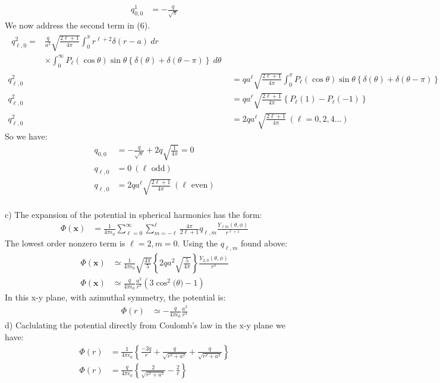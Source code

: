 \documentclass[a4paper,11pt]{article}
\numberwithin{equation}{section}
\newcommand{\bv}[1]{\mathbf{#1}}
\newcommand{\ez}{\epsilon_0}
\newcommand{\lrp}[1]{\left({#1}\right)}
\newcommand{\lrb}[1]{\left\{{#1}\right\}}
\begin{document}
\begin{align}
 q^1_{0,0} &= -\frac{q}{\sqrt{\pi}}
\end{align}
We now address the second term in (6).
\begin{align}
\begin{split}
 q^2_{\ell,0} = &\frac{q}{a^2} \sqrt{\frac{2\ell+1}{4\pi}}\int_0^\pi r^{\ell+2} \delta(r-a) \ dr \\
		&\times \int_0^\infty P_\ell(\cos{\theta})\sin{\theta} \lrb{\delta(\theta)+\delta(\theta-\pi)}\ d\theta
\end{split}\\
 q^2_{\ell,0} &= qa^\ell\sqrt{\frac{2\ell+1}{4\pi}} \int_0^\pi  P_\ell(\cos{\theta})\sin{\theta} \lrb{\delta(\theta)+\delta(\theta-\pi)}\ d\theta\\
 q^2_{\ell,0} &= qa^\ell\sqrt{\frac{2\ell+1}{4\pi}} \lrb{P_\ell(1)-P_\ell(-1)}\\
 q^2_{\ell,0} &= 2qa^\ell\sqrt{\frac{2\ell+1}{4\pi}}\ (\ell=0,2,4...)
\end{align}
So we have:
\begin{align}
 q_{0,0} &= -\frac{q}{\sqrt{\pi}}+2q\sqrt{\frac{1}{4\pi}}=0\\
 q_{\ell,0} &= 0\ (\ell \text{ odd})\\
 q_{\ell,0} &= 2qa^\ell\sqrt{\frac{2\ell+1}{4\pi}}\ (\ell \text{ even})
\end{align}
\\
c) The expansion of the potential in spherical harmonics has the form:
\begin{align}
 \Phi(\bv{x}) &= \frac{1}{4\pi\ez}\sum_{\ell=0}^\infty \sum_{m=-\ell}^\ell \frac{4\pi}{2\ell+1}q_{\ell,m}\frac{Y_{\ell m}(\theta,\phi)}{r^{\ell+1}}
\end{align}
The lowest order nonzero term is $\ell=2,m=0$.
Using the $q_{\ell,m}$ found above:
\begin{align}
 \Phi(\bv{x}) &\simeq \frac{1}{4\pi\ez}\sqrt{\frac{4\pi}{5}}\lrb{2qa^2\sqrt{\frac{5}{4\pi}}}\frac{Y_{2,0}(\theta,\phi)}{r^3}\\
 \Phi(\bv{x}) &\simeq \frac{q}{4\pi\ez}\frac{a^2}{r^3}\lrp{3\cos^2{(\theta})-1}
\end{align}
In this x-y plane, with azimuthal symmetry, the potential is:
\begin{align}
 \Phi(r) &\simeq -\frac{q}{4\pi\ez}\frac{a^2}{r^3}
\end{align}
d) Caclulating the potential directly from Coulomb's law in the x-y plane we have:
\begin{align}
 \Phi(r) &= \frac{1}{4\pi\ez}\lrb{\frac{-2q}{r}+\frac{q}{\sqrt{r^2+a^2}}+\frac{q}{\sqrt{r^2+a^2}} }\\
 \Phi(r) &= \frac{q}{4\pi\ez}\lrb{\frac{2}{\sqrt{r^2+a^2}}-\frac{2}{r}}\\
\end{align}
\end{document}
